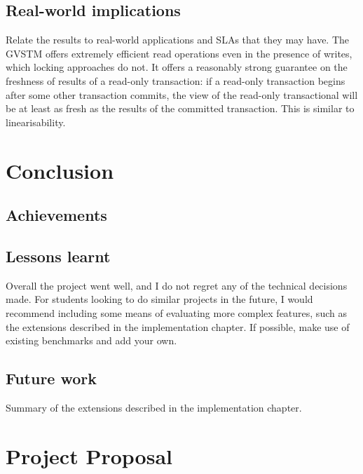 \documentclass[12pt,a4paper,oneside,openright]{report}
\begin{document}
\section{Real-world implications}
\label{sec:eval:real-world-impl}

Relate the results to real-world applications and SLAs that they may
have. The GVSTM offers extremely efficient read operations even in the
presence of writes, which locking approaches do not. It offers a
reasonably strong guarantee on the freshness of results of a read-only
transaction: if a read-only transaction begins after some other
transaction commits, the view of the read-only transactional will be
at least as fresh as the results of the committed transaction. This is
similar to linearisability.


\chapter{Conclusion}

\section{Achievements}
\label{sec:conc:achievements}

\section{Lessons learnt}
\label{sec:conc:lessons-learnt}

Overall the project went well, and I do not regret any of the
technical decisions made. For students looking to do similar projects
in the future, I would recommend including some means of evaluating
more complex features, such as the extensions described in the
implementation chapter. If possible, make use of existing benchmarks
and add your own.

\section{Future work}
\label{sec:conc:future-work}

Summary of the extensions described in the implementation chapter.



\appendix

\chapter{Project Proposal}
\end{document}

